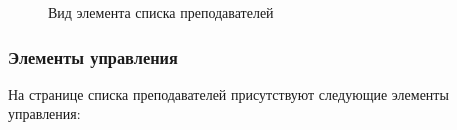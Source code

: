 	\begin{figure}[H]
	\caption{Вид элемента списка преподавателей}
	\label{instructor:list_courses}
	\end{figure}

\subsubsection{Элементы управления}
На странице списка преподавателей присутствуют следующие элементы управления:
